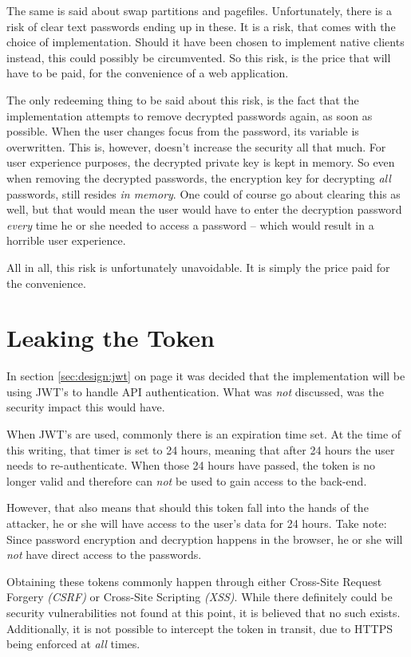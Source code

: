 		The same is said about swap partitions and pagefiles. Unfortunately, there is a risk of clear text passwords ending up in these. It is a risk, that comes with the choice of implementation. Should it have been chosen to implement native clients instead, this could possibly be circumvented. So this risk, is the price that will have to be paid, for the convenience of a web application.

		The only redeeming thing to be said about this risk, is the fact that the implementation attempts to remove decrypted passwords again, as soon as possible. When the user changes focus from the password, its variable is overwritten. This is, however, doesn't increase the security all that much. For user experience purposes, the decrypted private key is kept in memory. So even when removing the decrypted passwords, the encryption key for decrypting \emph{all} passwords, still resides \emph{in memory}. One could of course go about clearing this as well, but that would mean the user would have to enter the decryption password \emph{every} time he or she needed to access a password -- which would result in a horrible user experience.

		All in all, this risk is unfortunately unavoidable. It is simply the price paid for the convenience.

	\section{Leaking the Token}
		In section \ref{sec:design:jwt} on page \pageref{sec:design:jwt} it was decided that the implementation will be using JWT's to handle API authentication. What was \emph{not} discussed, was the security impact this would have.

		When JWT's are used, commonly there is an expiration time set. At the time of this writing, that timer is set to 24 hours, meaning that after 24 hours the user needs to re-authenticate. When those 24 hours have passed, the token is no longer valid and therefore can \emph{not} be used to gain access to the back-end.

		However, that also means that should this token fall into the hands of the attacker, he or she will have access to the user's data for 24 hours. Take note: Since password encryption and decryption happens in the browser, he or she will \emph{not} have direct access to the passwords.

		Obtaining these tokens commonly happen through either Cross-Site Request Forgery \emph{(CSRF)} or Cross-Site Scripting \emph{(XSS)}. While there definitely could be security vulnerabilities not found at this point, it is believed that no such exists. Additionally, it is not possible to intercept the token in transit, due to HTTPS being enforced at \emph{all} times.


